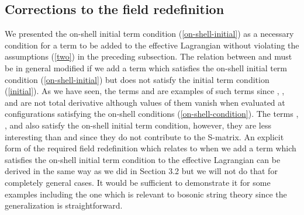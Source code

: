 \documentclass[a4paper,12pt]{article}
\begin{document}
\subsection{Corrections to the field redefinition}
\indent

We presented the on-shell initial term condition
(\ref{on-shell-initial}) as a necessary condition
for a term to be added to the effective Lagrangian
without violating the assumptions (\ref{two})
in the preceding subsection.
The relation between \coordHE{} and \coordHE{}
must be in general modified
if we add a term which satisfies the on-shell
initial term condition (\ref{on-shell-initial}) but does not
satisfy the initial term condition (\ref{initial}).
As we have seen, the terms \coordHE{} and \coordHE{}
are examples of such terms
since \coordHE{}, \coordHE{}, \coordHE{} and \coordHE{}
are not total derivative although values of them vanish
when evaluated at configurations satisfying the on-shell
conditions (\ref{on-shell-condition}).
The terms \coordHE{}, \coordHE{}, \coordHE{} and \coordHE{}
also satisfy the on-shell initial
term condition, however, they are less interesting than \coordHE{} and
\coordHE{} since they do not contribute to the S-matrix.
An explicit form of the required field redefinition
which relates \coordHE{} to \coordHE{} when we add a term
which satisfies the on-shell initial term condition
to the effective Lagrangian
can be derived in the same way as we did in Section 3.2
but we will not do that for completely general cases.
It would be sufficient to demonstrate it for some examples
including the one which is relevant to bosonic string theory
since the generalization is straightforward.
\end{document}
